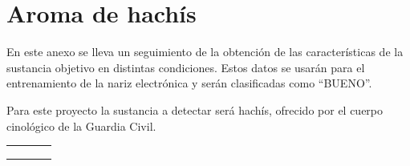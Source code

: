 \chapter{Aroma de hachís}
En este anexo se lleva un seguimiento de la obtención de las características de la sustancia objetivo en distintas condiciones. Estos datos se usarán para el entrenamiento de la nariz electrónica y serán clasificadas como ``BUENO''.

Para este proyecto la sustancia a detectar será hachís, ofrecido por el cuerpo cinológico de la Guardia Civil.

\footnotesize
\setlength{\tabcolsep}{4pt}
\begin{xltabular}{\textwidth}{@{} >{\centering\arraybackslash}p{0.18\textwidth} >{\centering\arraybackslash}X >{\centering\arraybackslash}X >{\raggedright\arraybackslash}X @{}}
		\toprule
	 &  &  &  \\
\midrule
\endfirsthead%

		\toprule
	 &  &  &  \\
\midrule
\endhead%

\midrule {}\\
\endfoot%


\end{xltabular}
